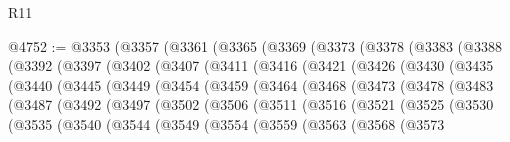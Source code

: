 \begin{lexlean}{R11}
\begin{coremodule}
{{{{{{{{{{{{{{{{{{{{{{{{{{{{{{{{{{{{{{{{{{{{{{{{{{{{{{{{{{{{{{{{{{{{{{{{{{{{{{{{{{@4752 := @3353
    (@3357
      (@3361
        (@3365
          (@3369
            (@3373
              (@3378
                (@3383
                  (@3388
                    (@3392
                      (@3397
                        (@3402
                          (@3407
                            (@3411
                              (@3416
                                (@3421
                                  (@3426
                                    (@3430
                                      (@3435
                                        (@3440
                                          (@3445
                                            (@3449
                                              (@3454
                                                (@3459
                                                  (@3464
                                                    (@3468
                                                      (@3473
                                                        (@3478
                                                          (@3483
                                                            (@3487
                                                              (@3492
                                                                (@3497
                                                                  (@3502
                                                                    (@3506
                                                                      (@3511
                                                                        (@3516
                                                                          (@3521
                                                                            (@3525
                                                                              (@3530
                                                                                (@3535
                                                                                  (@3540
                                                                                    (@3544
                                                                                      (@3549
                                                                                        (@3554
                                                                                          (@3559
                                                                                            (@3563
                                                                                              (@3568
                                                                                                (@3573
}}}}}}}}}}}}}}}}}}}}}}}}}}}}}}}}}}}}}}}}}}}}}}}}}}}}}}}}}}}}}}}}}}}}}}}}}}}}}}}}}}
\end{coremodule}
\end{lexlean}
